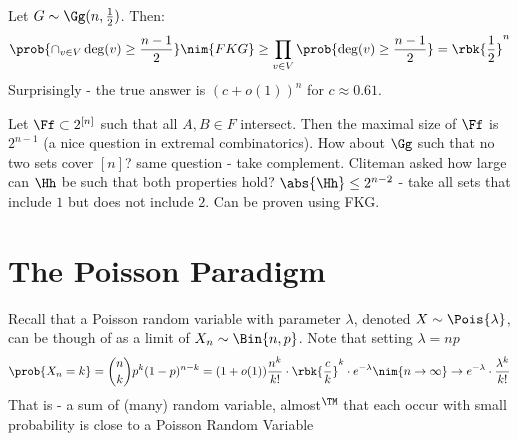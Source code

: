 \documentclass[a4paper, 11pt, oneside]{book}
\begin{document}
\begin{example}
	Let $G\sim \Gg(n,\frac{1}{2})$. Then:
	 \[\prob{\cap_{v\in V}\deg(v)\ge\frac{n-1}{2}}\nim{FKG}\ge \prod_{v\in V}\prob{\deg(v)\ge \frac{n-1}{2}} = \rbk{\frac{1}{2}}^n\]
	 Surprisingly - the true answer is $(c+o(1))^n$ for $c \approx 0.61$.
\end{example}
\begin{example}
	Let $\Ff\subset 2^{[n]}$ such that all $A,B\in F$ intersect. Then the maximal size of $\Ff$ is $2^{n-1}$ (a nice question in extremal combinatorics). How about $\Gg$ such that no two sets cover $[n]$? same question - take complement. Cliteman asked how large can $\Hh$ be such that both properties hold? $\abs{\Hh} \le 2^{n-2}$ - take all sets that include $1$ but does not include $2$. Can be proven using FKG.
\end{example}

\chapter{The Poisson Paradigm}

Recall that a Poisson random variable with parameter $\lambda$, denoted $X\sim \Pois{\lambda}$, can be though of as a limit of $X_n\sim \Bin{n,p}$. Note that setting $\lambda = np$
\[
\prob{X_n = k} = {n\choose k}p^k(1-p)^{n-k} = (1+o(1))\frac{n^k}{k!}\cdot\rbk{\frac{c}{k}}^k\cdot e^{-\lambda} \nim{n\to \infty}\to  e^{-\lambda}\cdot\frac{\lambda^k}{k!}
\]
That is - a sum of (many) random variable, almost$^\TM$ that each occur with small probability is close to a Poisson Random Variable
\end{document}

